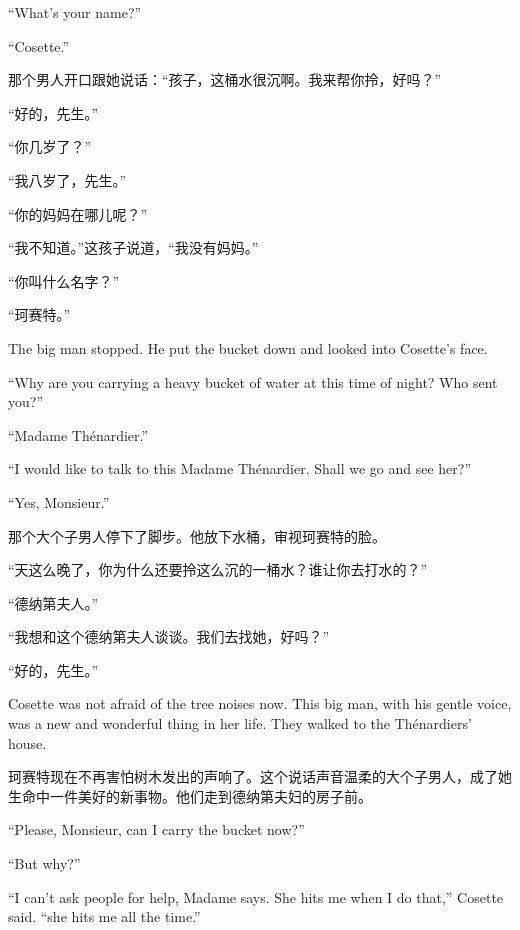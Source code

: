 \documentclass[fontset=ubuntu, zihao=5]{ctexart}
\begin{document}
\begin{paracol}{2}
  ``What's your name?''


  ``Cosette.''

  \switchcolumn

  那个男人开口跟她说话：“孩子，这桶水很沉啊。我来帮你拎，好吗？”

  “好的，先生。”

  “你几岁了？”

  “我八岁了，先生。”

  “你的妈妈在哪儿呢？”

  “我不知道。”这孩子说道，“我没有妈妈。”

  “你叫什么名字？”

  “珂赛特。”

  \switchcolumn*

  The big man stopped. He put the bucket down and looked into Cosette's face.


  ``Why are you carrying a heavy bucket of water at this time of night? Who sent you?''


  ``Madame Thénardier.''


  ``I would like to talk to this Madame Thénardier. Shall we go and see her?''


  ``Yes, Monsieur.''

  \switchcolumn

  那个大个子男人停下了脚步。他放下水桶，审视珂赛特的脸。

  “天这么晚了，你为什么还要拎这么沉的一桶水？谁让你去打水的？”

  “德纳第夫人。”

  “我想和这个德纳第夫人谈谈。我们去找她，好吗？”

  “好的，先生。”

  \switchcolumn*

  Cosette was not afraid of the tree noises now. This big man, with his gentle voice, was a new and wonderful thing in her life. They walked to the Thénardiers' house.

  \switchcolumn

  珂赛特现在不再害怕树木发出的声响了。这个说话声音温柔的大个子男人，成了她生命中一件美好的新事物。他们走到德纳第夫妇的房子前。

  \switchcolumn*

  ``Please, Monsieur, can I carry the bucket now?''

  ``But why?''


  ``I can't ask people for help, Madame says. She hits me when I do that,'' Cosette said. ``she hits me all the time.''


\end{paracol}
\end{document}
